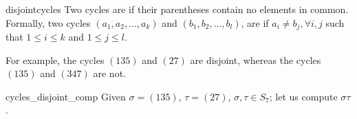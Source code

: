 
\begin{defn}{disjointcycles} 
Two cycles are  if their parentheses contain no elements in common.  Formally,
two cycles $(a_1, a_2, \ldots, a_k )$ and $(b_1, b_2, \ldots, b_l )$, are 
if $a_i \neq b_j, \forall i, j $ such that $1 \le i \le k$ and $1 \le j \le l$. 
\end{defn}

\noindent
For example, the  cycles $(135)$ and $(27 )$ are disjoint, whereas the cycles
$(135)$ and $(347 )$ are not.  

\begin{example}{cycles_disjoint_comp}
Given $\sigma = (135)$, $\tau = (27)$, $\sigma , \tau \in S_7$; let us compute $\sigma \tau$. 
%
%
%
%
%


\end{example}
